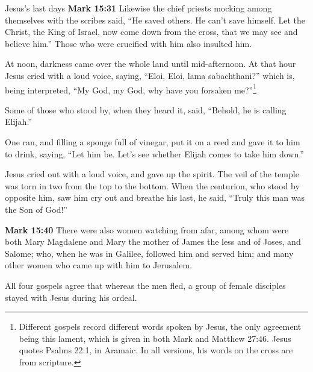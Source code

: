 \documentclass[10pt,twoside]{article} %
\newcommand{\doimage}[2]{\texttt{[image: \#2]}\label{fig:#2}}
\newcommand{\figbasic}[4]{ %
    \ifthenelse{\isodd{\pageref{fig:#2}}}{}{\hfill}
    \ifstrempty{#3}{
      \doimage{#1}{#2}
    }{
      \makebox{\doimage{#1}{#2} \\ #3}
    }
    \ifthenelse{\isodd{\pageref{fig:#2}}}{\hfill}{}
    \par
}
\newcommand{\fig}[2][0.4]{
  \figbasic{#1}{#2}{}{}
}
\newcommand{\quotesize}{\normalsize{}}
\newcommand{\comm}[1]{\begingroup \color{black!50} #1\endgroup}
\newenvironment{quotetext}{\begingroup\quotesize}{\endgroup}
\newcommand{\intex}[1]{\index[texts]{#1}}
\newcommand{\bible}[2]{\begin{quotetext}\textbf{#1}\intex{#1} #2\end{quotetext}}
\newcommand{\gospelmark}[2]{\bible{Mark #1}{#2}}
\begin{document}
\begin{section}{Jesus's last days}
\gospelmark{15:31}{
  Likewise the chief priests mocking among themselves with the scribes said, ``He saved others. He can't save himself.   Let the Christ, the King of Israel, now come down from the cross, that we may see and believe him.'' Those who were crucified with him also insulted him.

  At noon, darkness came over the whole land until mid-afternoon.   At that hour Jesus cried with a loud voice, saying, ``Eloi, Eloi, lama sabachthani?'' which is, being interpreted, ``My God, my God, why have
you forsaken me?''\footnote{Different gospels record different words spoken by Jesus, the only agreement being this lament, which is
given in both Mark and Matthew 27:46. Jesus quotes Psalms 22:1, in Aramaic. In all versions, his words on the cross are from scripture.}

  Some of those who stood by, when they heard it, said, ``Behold, he is calling Elijah.''

  One ran, and filling a sponge full of vinegar, put it on a reed and gave it to him to drink, saying, ``Let him be. Let's see whether Elijah comes to take him down.''

  Jesus cried out with a loud voice, and gave up the spirit.   The veil of the temple was torn in two from the top to the bottom.   
When the centurion, who stood by opposite him, saw him cry out and breathe his last, he said, ``Truly this man was the Son of God!''}

\fig[0.6]{what-our-lord-saw-from-the-cross-detail}

\gospelmark{15:40}{
  There were also women watching from afar, among whom were both Mary Magdalene and Mary the mother of James the less and of Joses, and Salome;   who, when he was in Galilee, followed him and served him; and many other women who came up with him to Jerusalem.
}

\comm{All four gospels agree that whereas the men fled, a group of female disciples stayed with Jesus during his ordeal.}

\end{section}

\fig{resurrection-mary-magdalene}
\end{document}
